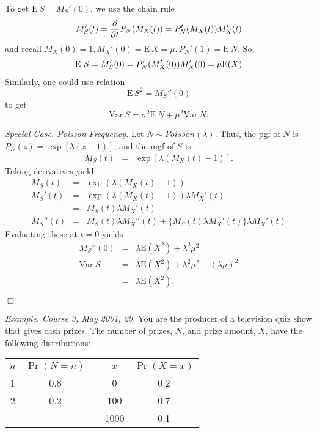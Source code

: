 \documentclass[12pt,letterpaper]{article}
\begin{document}
To get $\mathrm{E~}S = M_{S}'(0)$, we use the chain rule
\[
M_{S}'(t) = \frac{\partial}{\partial t} P_{N}(M_{X}(t)) = P_{N}'(M_{X}(t)) M_{X}'(t)\\
\]
and recall $M_{X}(0) = 1, M_{X}'(0) = \mathrm{E~}X = \mu, P_{N}'(1) = \mathrm{E~}N$. So,
\begin{eqnarray*}
\mathrm{E~}S = M_{S}'(0) = P_{N}'(M_{X}'(0)) M_{X}'(0) = \mu {\rm E}(X)
\end{eqnarray*}
Similarly, one could use relation
\[
\mathrm{E~}S^2 = M_{S}''(0)
\]
to get
\[\mathrm{Var~}S = \sigma^2 \mathrm{E~}N + \mu^2 \mathrm{Var~}N.\]

\bigskip

\noindent \textit{Special Case. Poisson Frequency.} Let $N \sim Poisson (\lambda)$. Thus, the pgf of $N$ is $P_N (z) =\exp[\lambda(z-1)]$, and the mgf of $S$ is
\begin{eqnarray*}
M_{S}(t) &=&\exp[\lambda(M_{X}(t) - 1)].
\end{eqnarray*}
Taking derivatives yield
\begin{eqnarray*}
M_{S}(t) &=&\exp(\lambda(M_{X}(t) - 1))\\
M_{S}'(t) &=&\exp(\lambda(M_{X}(t) - 1)) \lambda M_{X}'(t)\\
&=& M_{S}(t) \lambda M_{X}'(t)\\
M_{S}''(t) &=& M_{S}(t) \lambda M_{X}''(t) + \{M_{S}(t) \lambda M_{X}'(t)\} \lambda M_{X}'(t)
\end{eqnarray*}
Evaluating these at $t=0$ yields
\begin{eqnarray*}
M_{S}''(0) &=& \lambda \mathrm{E}(X^2) + \lambda^2 \mu^2\\
\mathrm{Var~}S &=& \lambda \mathrm{E}(X^2) + \lambda^2 \mu^2 - (\lambda \mu)^2\\
&=& \lambda \mathrm{E}(X^2).
\end{eqnarray*}
\begin{flushright}$\Box$\end{flushright}




\noindent \textit{Example. Course 3, May 2001, 29.} You are the producer of a television quiz show that gives cash prizes. The number of prizes, $N$, and prize amount, $X$, have the following distributions:\\

\begin{center}
\begin{tabular}{c c c c c}\hline
    $n$ & $\Pr(N=n)$ & & $x$ & $\Pr(X=x)$\\ \hline
    1 & 0.8 & & 0 & 0.2 \\
    2 & 0.2 & & 100 & 0.7 \\
       &       & & 1000 & 0.1\\\hline
  \end{tabular}
\end{center}
\bigskip
\end{document}
